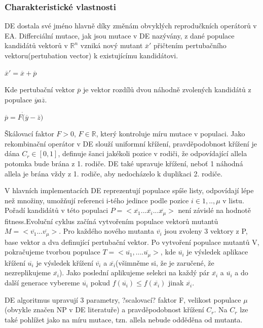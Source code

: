 \subsubsection{Charakteristické vlastnosti}
DE dostala své jméno hlavně díky změnám obvyklých reprodučkních operátorů v EA. Differciální mutace, jak jsou mutace v DE nazývány, z dané populace kandidátů vektorů v $\mathbb{R}^n$ vzniká nový mutant $\overline{x}'$ přičtením pertubačního vektoru(pertubation vector) k existujícímu kandidátovi. \par
$\overline{x}'=\overline{x}+\overline{p}$ \par
Kde pertubační vektor $\overline{p}$ je vektor rozdílů dvou náhodně zvolených kandidátů z populace $\overline{y} a \overline{z}$. \par 
$\overline{p}=F\dot(\overline{y}-\overline{z})$ \par
Škálovací faktor $F>0$, $F \in \mathbb{R}$, který kontroluje míru mutace v populaci. Jako rekombinační operátor v DE slouží uniformní křížení, pravděpodobnost křížení je dána $C_r \in [0,1]$, definuje šanci jakékoli pozice v rodiči, že odpovídající allela potomka bude brána z 1. rodiče. DE také upravuje křížení, neboť 1 náhodná allela je brána vždy z 1. rodiče, aby nedocházelo k duplikaci 2. rodiče. \par 
V hlavních implementacích DE reprezentují populace spíše listy, odpovídají lépe než množiny, umožňují referenci i-tého jedince podle pozice $i\in{1,..,\mu}$ v listu. Pořadí kandidátů v této populaci $P=<\overline{x_1}...\overline{x_i}...\overline{x_{\mu}}>$ není závislé na hodnotě fitness.Evoluční cyklus začíná vytvořením populace vektorů mutantů $M=<\overline{v_1}...\overline{v_{\mu}}>$. Pro každého nového mutanta $\overline{v_i}$ jsou zvoleny 3 vektory z P, base vektor a dva definující pertubační vektor. Po vytvoření populace mutantů V, pokračujeme tvorbou populace $T=<\overline{u_1},....\overline{u_{\mu}}>$, kde $\overline{u_i}$ je výsledek aplikace křížení $\overline{u_i}$ je výsledek křížení $\overline{v_i}$ a $\overline{x_i}$(všimněme si, že je zaručené, že nezreplikujeme $\overline{x_i}$). Jako poslední aplikujeme selekci na každý pár $\overline{x_i}$ a $\overline{u_i}$ a do další generace vybereme $\overline{u_i}$ pokud $f(\overline{u_i}) \leq f(\overline{x_i})$ jinak $\overline{x_i}$. \par 
DE algoritmus upravují 3 parametry, ?scalovací? faktor F, velikost populace $\mu$ (obvykle značen NP v DE literatuře) a pravděpodobnost křížení $C_r$. Na $C_r$ lze také pohlížet jako na míru mutace, tzn. allela nebude odděděna od mutanta.\par

